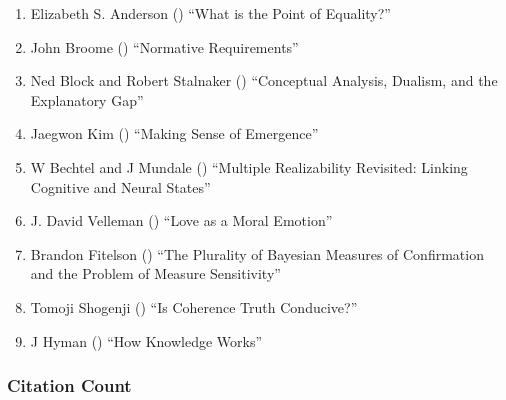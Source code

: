\documentclass[
  10pt,
  letterpaper,
  DIV=11,
  numbers=noendperiod,
  twoside]{scrartcl}
\providecommand{\tightlist}{%
  \setlength{\itemsep}{0pt}\setlength{\parskip}{0pt}}\usepackage{longtable,booktabs,array}
\begin{document}
\begin{enumerate}
\def\labelenumi{\arabic{enumi}.}
\tightlist
\item
  Elizabeth S. Anderson () ``What
  is the Point of Equality?''
\item
  John Broome () ``Normative
  Requirements''
\item
  Ned Block and Robert Stalnaker
  () ``Conceptual Analysis,
  Dualism, and the Explanatory Gap''
\item
  Jaegwon Kim () ``Making Sense
  of Emergence''
\item
  W Bechtel and J Mundale ()
  ``Multiple Realizability Revisited: Linking Cognitive and Neural
  States''
\item
  J. David Velleman () ``Love as
  a Moral Emotion''
\item
  Brandon Fitelson () ``The
  Plurality of Bayesian Measures of Confirmation and the Problem of
  Measure Sensitivity''
\item
  Tomoji Shogenji () ``Is
  Coherence Truth Conducive?''
\item
  J Hyman () ``How Knowledge
  Works''
\end{enumerate}

\subsubsection*{Citation Count}\label{sec-count-1999}
\end{document}
